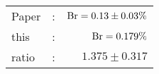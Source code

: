       \begin{tabular}{lcr}
          Paper &:& $\mathrm{Br}  = 0.13\pm 0.03\%$ \\
          this      &:& $\mathrm{Br}  = 0.179\%$ \\
		  ratio   &:& $1.375\pm 0.317$ \\
      \end{tabular}
